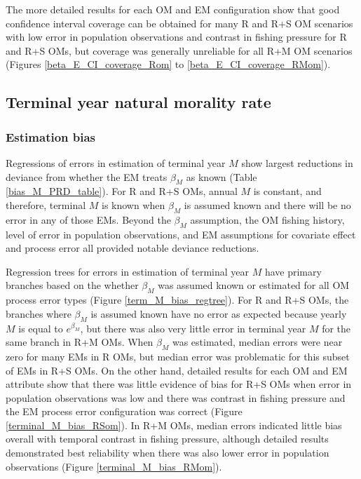 \documentclass[
  12pt,
]{article}
\begin{document}
The more detailed results for each OM and EM configuration show that good confidence interval coverage can be obtained for many R and R+S OM scenarios with low error in population observations and contrast in fishing pressure for R and R+S OMs, but coverage was generally unreliable for all R+M OM scenarios (Figures \ref{beta_E_CI_coverage_Rom} to \ref{beta_E_CI_coverage_RMom}).

\subsection*{Terminal year natural morality rate}\label{terminal-year-natural-morality-rate}

\subsubsection*{Estimation bias}\label{estimation-bias-2}

Regressions of errors in estimation of terminal year \(M\) show largest reductions in deviance from whether the EM treats \(\beta_M\) as known (Table \ref{bias_M_PRD_table}). For R and R+S OMs, annual \(M\) is constant, and therefore, terminal \(M\) is known when \(\beta_M\) is assumed known and there will be no error in any of those EMs. Beyond the \(\beta_M\) assumption, the OM fishing history, level of error in population observations, and EM assumptions for covariate effect and process error all provided notable deviance reductions.

Regression trees for errors in estimation of terminal year \(M\) have primary branches based on the whether \(\beta_M\) was assumed known or estimated for all OM process error types (Figure \ref{term_M_bias_regtree}). For R and R+S OMs, the branches where \(\beta_M\) is assumed known have no error as expected because yearly \(M\) is equal to \(e^{\beta_M}\), but there was also very little error in terminal year \(M\) for the same branch in R+M OMs. When \(\beta_M\) was estimated, median errors were near zero for many EMs in R OMs, but median error was problematic for this subset of EMs in R+S OMs. On the other hand, detailed results for each OM and EM attribute show that there was little evidence of bias for R+S OMs when error in population observations was low and there was contrast in fishing pressure and the EM process error configuration was correct (Figure \ref{terminal_M_bias_RSom}). In R+M OMs, median errors indicated little bias overall with temporal contrast in fishing pressure, although detailed results demonstrated best reliability when there was also lower error in population observations (Figure \ref{terminal_M_bias_RMom}).
\end{document}
